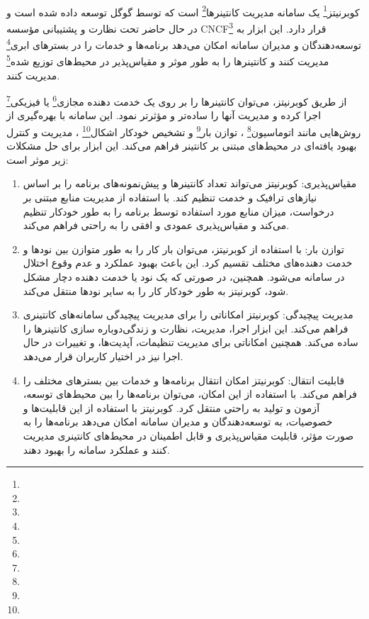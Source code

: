 \paragraph{}
{
    کوبرنیتز\footnote{}
    یک سامانه مدیریت
    کانتینرها\footnote{}
    است که توسط گوگل توسعه داده شده است و در حال حاضر تحت نظارت و پشتیبانی مؤسسه
    CNCF\footnote{}
    قرار دارد. این ابزار به توسعه‌دهندگان و مدیران سامانه امکان می‌دهد برنامه‌ها و خدمات را در
    بسترهای ابری\footnote{}
    مدیریت کنند و کانتینرها را به طور موثر و مقیاس‌پذیر در
    محیط‌های توزیع شده\footnote{}
    مدیریت کنند.
    
    از طریق کوبرنیتز، می‌توان کانتینرها را بر روی یک
    خدمت دهنده‌ مجازی\footnote{}
    یا 
    فیزیکی\footnote{}
    اجرا کرده و مدیریت آنها را ساده‌تر و مؤثرتر نمود. این سامانه با بهره‌گیری از روش‌هایی مانند
    اتوماسیون\footnote{}
    ، توازن بار\footnote{}
    و تشخیص خودکار اشکال\footnote{}
    ، مدیریت و کنترل بهبود یافته‌ای در محیط‌های مبتنی بر کانتینر فراهم می‌کند.
    این ابزار برای حل مشکلات زیر موثر است:
    \begin{enumerate}
        \item مقیاس‌پذیری: کوبرنیتز می‌تواند تعداد کانتینرها و پیش‌نمونه‌های برنامه را بر اساس نیازهای ترافیک و خدمت تنظیم کند. با استفاده از مدیریت منابع مبتنی بر درخواست، میزان منابع مورد استفاده توسط برنامه را به طور خودکار تنظیم می‌کند و مقیاس‌پذیری عمودی و افقی را به راحتی فراهم می‌کند.
        \item توازن بار: با استفاده از کوبرنیتز، می‌توان بار کار را به طور متوازن بین نودها و خدمت دهنده‌های مختلف تقسیم کرد. این باعث بهبود عملکرد و عدم وقوع اختلال در سامانه می‌شود. همچنین، در صورتی که یک نود یا خدمت دهنده‌ دچار مشکل شود، کوبرنیتز به طور خودکار کار را به سایر نودها منتقل می‌کند.
        \item مدیریت پیچیدگی: کوبرنیتز امکاناتی را برای مدیریت پیچیدگی سامانه‌های کانتینری فراهم می‌کند. این ابزار اجرا، مدیریت، نظارت و زندگی‌دوباره سازی کانتینرها را ساده می‌کند. همچنین امکاناتی برای مدیریت تنظیمات، آپدیت‌ها، و تغییرات در حال اجرا نیز در اختیار کاربران قرار می‌دهد.
        \item قابلیت انتقال: کوبرنیتز امکان انتقال برنامه‌ها و خدمات بین بسترهای مختلف را فراهم می‌کند. با استفاده از این امکان، می‌توان برنامه‌ها را بین محیط‌های توسعه، آزمون و تولید به راحتی منتقل کرد. کوبرنیتز با استفاده از این قابلیت‌ها و خصوصیات، به توسعه‌دهندگان و مدیران سامانه امکان می‌دهد برنامه‌ها را به صورت مؤثر، قابلیت مقیاس‌پذیری و قابل اطمینان در محیط‌های کانتینری مدیریت کنند و عملکرد سامانه را بهبود دهند.

\end{enumerate}}
